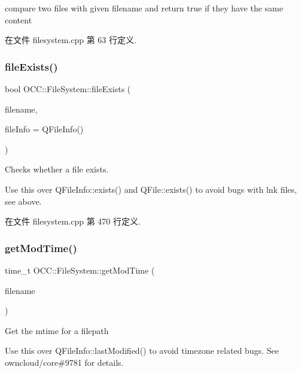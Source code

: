 compare two files with given filename and return true if they have the same content 



在文件 filesystem.\+cpp 第 63 行定义.

\mbox{\label{namespace_o_c_c_1_1_file_system_a667715e37de108acf2f298f3da489456}} 
\subsubsection{\texorpdfstring{file\+Exists()}{fileExists()}}
{\footnotesize\ttfamily bool O\+C\+C\+::\+File\+System\+::file\+Exists (\begin{DoxyParamCaption}\item[{const Q\+String \&}]{filename,  }\item[{const Q\+File\+Info \&}]{file\+Info = {\ttfamily QFileInfo()} }\end{DoxyParamCaption})}



Checks whether a file exists. 

Use this over Q\+File\+Info\+::exists() and Q\+File\+::exists() to avoid bugs with lnk files, see above. 

在文件 filesystem.\+cpp 第 470 行定义.

\mbox{\label{namespace_o_c_c_1_1_file_system_a9610837b3c96d1a689cd016b2ccb8fc4}} 
\subsubsection{\texorpdfstring{get\+Mod\+Time()}{getModTime()}}
{\footnotesize\ttfamily time\+\_\+t O\+C\+C\+::\+File\+System\+::get\+Mod\+Time (\begin{DoxyParamCaption}\item[{const Q\+String \&}]{filename }\end{DoxyParamCaption})}



Get the mtime for a filepath 

Use this over Q\+File\+Info\+::last\+Modified() to avoid timezone related bugs. See owncloud/core\#9781 for details. 

